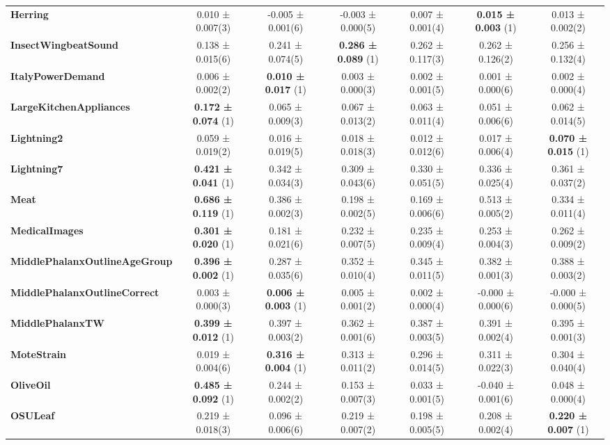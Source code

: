 \begin{table}[ht]
\begin{adjustbox}{width=\textwidth}
\begin{tabular}{lcccccc}
    \textbf{Herring} & 0.010 ± 0.007(3) & -0.005 ± 0.001(6) & -0.003 ± 0.000(5) & 0.007 ± 0.001(4) & \textbf{0.015 ± 0.003} (1) & 0.013 ± 0.002(2) \\
    \textbf{InsectWingbeatSound} & 0.138 ± 0.015(6) & 0.241 ± 0.074(5) & \textbf{0.286 ± 0.089} (1) & 0.262 ± 0.117(3) & 0.262 ± 0.126(2) & 0.256 ± 0.132(4) \\
    \textbf{ItalyPowerDemand} & 0.006 ± 0.002(2) & \textbf{0.010 ± 0.017} (1) & 0.003 ± 0.000(3) & 0.002 ± 0.001(5) & 0.001 ± 0.000(6) & 0.002 ± 0.000(4) \\
    \textbf{LargeKitchenAppliances} & \textbf{0.172 ± 0.074} (1) & 0.065 ± 0.009(3) & 0.067 ± 0.013(2) & 0.063 ± 0.011(4) & 0.051 ± 0.006(6) & 0.062 ± 0.014(5) \\
    \textbf{Lightning2} & 0.059 ± 0.019(2) & 0.016 ± 0.019(5) & 0.018 ± 0.018(3) & 0.012 ± 0.012(6) & 0.017 ± 0.006(4) & \textbf{0.070 ± 0.015} (1) \\
    \textbf{Lightning7} & \textbf{0.421 ± 0.041} (1) & 0.342 ± 0.034(3) & 0.309 ± 0.043(6) & 0.330 ± 0.051(5) & 0.336 ± 0.025(4) & 0.361 ± 0.037(2) \\
    \textbf{Meat} & \textbf{0.686 ± 0.119} (1) & 0.386 ± 0.002(3) & 0.198 ± 0.002(5) & 0.169 ± 0.006(6) & 0.513 ± 0.005(2) & 0.334 ± 0.011(4) \\
    \textbf{MedicalImages} & \textbf{0.301 ± 0.020} (1) & 0.181 ± 0.021(6) & 0.232 ± 0.007(5) & 0.235 ± 0.009(4) & 0.253 ± 0.004(3) & 0.262 ± 0.009(2) \\
    \textbf{MiddlePhalanxOutlineAgeGroup} & \textbf{0.396 ± 0.002} (1) & 0.287 ± 0.035(6) & 0.352 ± 0.010(4) & 0.345 ± 0.011(5) & 0.382 ± 0.001(3) & 0.388 ± 0.003(2) \\
    \textbf{MiddlePhalanxOutlineCorrect} & 0.003 ± 0.000(3) & \textbf{0.006 ± 0.003} (1) & 0.005 ± 0.001(2) & 0.002 ± 0.000(4) & -0.000 ± 0.000(6) & -0.000 ± 0.000(5) \\
    \textbf{MiddlePhalanxTW} & \textbf{0.399 ± 0.012} (1) & 0.397 ± 0.003(2) & 0.362 ± 0.001(6) & 0.387 ± 0.003(5) & 0.391 ± 0.002(4) & 0.395 ± 0.001(3) \\
    \textbf{MoteStrain} & 0.019 ± 0.004(6) & \textbf{0.316 ± 0.004} (1) & 0.313 ± 0.011(2) & 0.296 ± 0.014(5) & 0.311 ± 0.022(3) & 0.304 ± 0.040(4) \\
    \textbf{OliveOil} & \textbf{0.485 ± 0.092} (1) & 0.244 ± 0.002(2) & 0.153 ± 0.007(3) & 0.033 ± 0.001(5) & -0.040 ± 0.001(6) & 0.048 ± 0.000(4) \\
    \textbf{OSULeaf} & 0.219 ± 0.018(3) & 0.096 ± 0.006(6) & 0.219 ± 0.007(2) & 0.198 ± 0.005(5) & 0.208 ± 0.002(4) & \textbf{0.220 ± 0.007} (1) \\

\end{tabular}
\end{adjustbox}
\end{table}
